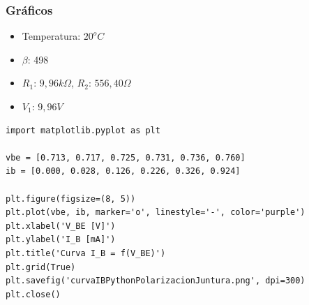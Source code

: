 \valentinoQuitaLasColumnas{}
\subsubsection{Gráficos}
\vspace{-1cm}
\begin{itemize}[nosep]
    \item Temperatura: $20^oC$
    \item $\beta$: 498
    \item $R_1$: $9,96k\Omega$, $R_2$: $556,40\Omega$ 
    \item $V_1$: $9,96V$
\end{itemize}

\newpage
\begin{verbatim}
import matplotlib.pyplot as plt

vbe = [0.713, 0.717, 0.725, 0.731, 0.736, 0.760]
ib = [0.000, 0.028, 0.126, 0.226, 0.326, 0.924]

plt.figure(figsize=(8, 5))
plt.plot(vbe, ib, marker='o', linestyle='-', color='purple')
plt.xlabel('V_BE [V]')
plt.ylabel('I_B [mA]')
plt.title('Curva I_B = f(V_BE)')
plt.grid(True)
plt.savefig('curvaIBPythonPolarizacionJuntura.png', dpi=300)
plt.close()
\end{verbatim}

\valentinoPoneLasColumnas{}
